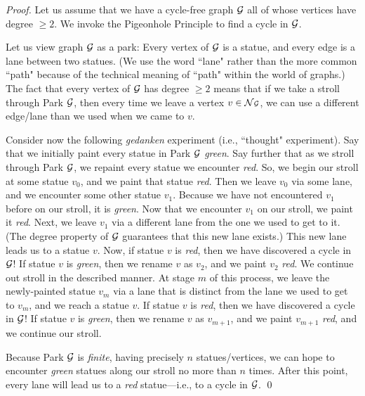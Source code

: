 \begin{proof}
Let us assume that we have a cycle-free graph $\mbox{$\cal G$}$ all of whose vertices
have degree $\geq 2$.  We invoke the Pigeonhole Principle to find a cycle in $\mbox{$\cal G$}$.

Let us view graph $\mbox{$\cal G$}$ as a park:  Every vertex of $\mbox{$\cal G$}$ is a statue, and every edge is a
lane between two statues.  (We use the word ``lane" rather than the more common ``path" 
because of the technical meaning of ``path" within the world of graphs.)   The fact that 
every vertex of $\mbox{$\cal G$}$ has degree $\geq 2$ means that if we take a stroll through Park $\mbox{$\cal G$}$,
then every time we leave a vertex $v \in \mbox{$\cal N$}{\mbox{{\scriptsize $\cal G$}}}$, we can use a  different edge/lane than we 
used when we came to $v$.

Consider now the following {\em gedanken} experiment (i.e., ``thought" experiment).  Say
that we initially paint every statue in Park $\mbox{$\cal G$}$ {\em green}.  Say further that as we stroll 
through Park $\mbox{$\cal G$}$, we repaint every statue we encounter {\em red}.  So, we begin our
stroll at some statue $v_0$, and we paint that statue {\em red}.  Then we  leave $v_0$ via 
some lane, and we encounter some other statue $v_1$.  Because we have not encountered
$v_1$ before on our stroll, it is {\em green}.  Now that we encounter $v_1$ on our stroll, we
paint it {\em red}.  Next, we leave $v_1$ via a different lane from the one we used to get to it. 
(The degree property of $\mbox{$\cal G$}$ guarantees that this new lane exists.)  This new lane leads us
to a statue $v$.  Now, if statue $v$ is {\em red}, then we have discovered a cycle in $\mbox{$\cal G$}$!  If
statue $v$ is {\em green}, then we rename $v$ as $v_2$, and we paint $v_2$ {\em red}.  We
continue out stroll in the described manner.  At stage $m$ of this process, we leave the 
newly-painted statue $v_m$ via a lane that is distinct from the lane we used to get to $v_m$, 
and we reach a statue $v$.  If statue $v$ is {\em red}, then we have discovered a cycle in $\mbox{$\cal G$}$!
If statue $v$ is {\em green}, then we rename $v$ as $v_{m+1}$, and we paint $v_{m+1}$ {\em red},
and we continue our stroll.

Because Park $\mbox{$\cal G$}$ is {\em finite}, having precisely $n$ statues/vertices, we can hope to encounter
{\em green} statues along our stroll no more than $n$ times.  After this point, every lane will lead
us to a {\em red} statue---i.e., to a cycle in $\mbox{$\cal G$}$.  \qed
\end{proof}

\bigskip

